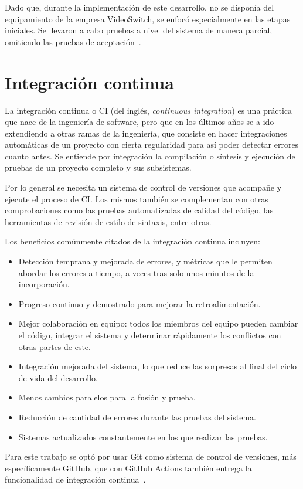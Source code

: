   Dado que, durante la implementación de este desarrollo, no se disponía del
  equipamiento de la empresa VideoSwitch, se enfocó especialmente en las etapas
  iniciales. Se llevaron a cabo pruebas a nivel del sistema de manera parcial,
  omitiendo las pruebas de aceptación~\citep{testbench}.


\section{Integración continua}

La integración continua o CI (del inglés, \textit{continuous integration}) es una
práctica que nace de la ingeniería de software, pero que en los últimos años se
a ido extendiendo a otras ramas de la ingeniería, que consiste en hacer
integraciones automáticas de un proyecto con cierta regularidad para así poder
detectar errores cuanto antes. Se entiende por integración la compilación o
síntesis y ejecución de pruebas de un proyecto completo y sus subsistemas. 

Por lo general se necesita un sistema de control de versiones que acompañe y
ejecute el proceso de CI\@. Los mismos también se complementan con otras
comprobaciones como las pruebas automatizadas de calidad del código, las
herramientas de revisión de estilo de sintaxis, entre otras.

Los beneficios comúnmente citados de la integración continua incluyen:
\begin{itemize}
  \item Detección temprana y mejorada de errores, y métricas que le permiten
  abordar los errores a tiempo, a veces tras solo unos minutos de la incorporación.
  \item Progreso continuo y demostrado para mejorar la retroalimentación.
  \item Mejor colaboración en equipo: todos los miembros del equipo pueden 
  cambiar el código, integrar el sistema y determinar rápidamente los conflictos
  con otras partes de este.
  \item Integración mejorada del sistema, lo que reduce las sorpresas al final
  del ciclo de vida del desarrollo.
  \item Menos cambios paralelos para la fusión y prueba.
  \item Reducción de cantidad de errores durante las pruebas del sistema.
  \item Sistemas actualizados constantemente en los que realizar las pruebas.
\end{itemize}

Para este trabajo se optó por usar Git como sistema de control de
versiones, más específicamente GitHub, que con GitHub Actions también entrega
la funcionalidad de integración continua~\citep{cicd}.